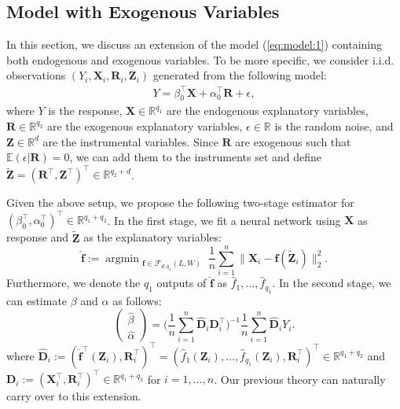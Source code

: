 \documentclass[11pt, preprint]{imsart}
\DeclareMathOperator*{\argmin}{argmin}
\numberwithin{equation}{section}
\def \mcF{\mathcal{F}}
\def \bfD{\mathbf{D}}
\def \bfX{\mathbf{X}}
\def \bfZ{\mathbf{Z}}
\def \bfD{\mathbf{D}}
\def \bff{\mathbf{f}}
\def \ev{\mathbb{E}}
\def \bff{\mathbf{f}}
\def \bfR{\mathbf{R}}
\theoremstyle{plain}
\theoremstyle{definition}
\begin{document}
\subsection{Model with Exogenous Variables}\label{sec:extension}
In this section, we discuss an extension of the model (\ref{eq:model:1}) containing both endogenous and exogenous variables. To be more specific, we consider i.i.d. observations $(Y_i, \bfX_i, \bfR_i, \bfZ_i)$ generated from the following model:
\begin{eqnarray}
	Y=\beta_0^\top \bfX+ \alpha_0^\top\bfR+\epsilon,\nonumber
\end{eqnarray}
where $Y$ is the response, $\bfX\in \mathbb{R}^{q_1}$ are the endogenous explanatory variables, $\bfR\in \mathbb{R}^{q_2}$ are the exogenous explanatory variables, $\epsilon\in \mathbb{R}$ is the random noise, and $\bfZ\in \mathbb{R}^d$ are the instrumental variables. Since $\bfR$ are exogenous such that $\ev(\epsilon | \bfR)=0$, we can add them to the instruments set and define $\widetilde{\bfZ}=(\bfR^\top, \bfZ^\top)^\top\in \mathbb{R}^{q_2+d}$. 

Given the above setup, we propose the following two-stage estimator for $(\beta_0^\top, \alpha_0^\top)^\top \in \mathbb{R}^{q_1+q_2}$. In the first stage, we fit a neural network using $\bfX$ as response and $\widetilde{\bfZ}$ as the explanatory variables:
\begin{equation}%
	\widehat{\bff}:=\argmin_{\substack{\bff\in \mcF_{d,q_1}(L, W)}}\frac{1}{n}\sum_{i=1}^n\|\bfX_i-\bff(\widetilde{\bfZ}_i)\|_2^2.\nonumber
\end{equation}
Furthermore, we denote the $q_1$ outputs of $\widehat{\bff}$ as $\widehat{f}_1,\ldots, \widehat{f}_{q_1}$. In the second stage,  we can estimate $\beta$ and $\alpha$ as follows:
\begin{equation}%
	\begin{pmatrix}
	\widehat{\beta}\\
	\widehat{\alpha}
	\end{pmatrix}=\bigg(\frac{1}{n}\sum_{i=1}^n\widehat{\bfD}_i\bfD_i^\top\bigg)^{-1}\frac{1}{n}\sum_{i=1}^n\widehat{\bfD}_i Y_i.\nonumber
\end{equation}
where $\widehat{\bfD}_i:=(\widehat{\bff}^\top(\bfZ_i), \bfR_i^\top)^\top=(\widehat{f}_1(\bfZ_i),\ldots, \widehat{f}_{q_1}(\bfZ_i), \bfR_i^\top)^\top\in \mathbb{R}^{q_1+q_2}$ and $\bfD_i:=(\bfX_i^\top, \bfR_i^\top)^\top \in \mathbb{R}^{q_1+q_2}$ for $i=1,\ldots, n$. Our previous theory can naturally carry over to this extension. 
\end{document}
